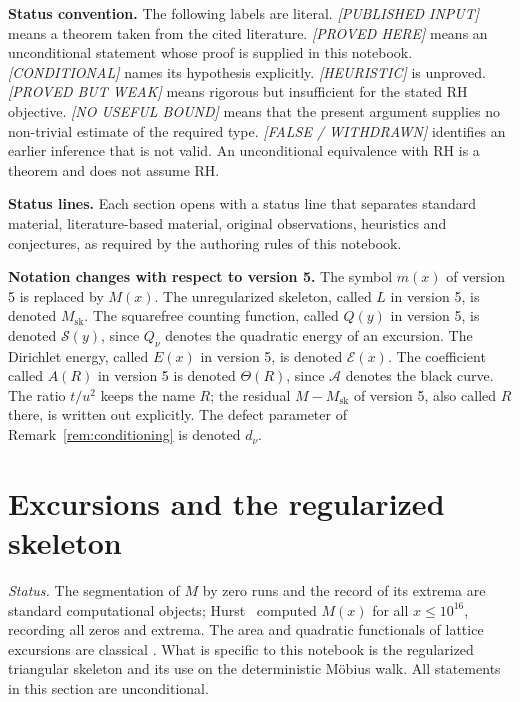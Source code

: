 \documentclass[11pt]{amsart}
\numberwithin{equation}{section}
\theoremstyle{plain}
\theoremstyle{definition}
\theoremstyle{remark}
\newcommand{\Msk}{M_{\mathrm{sk}}}
\newcommand{\Anet}{\mathcal{A}}
\newcommand{\Sq}{\mathcal{S}}
\newcommand{\En}{\mathcal{E}}
\begin{document}
\medskip
\noindent\textbf{Status convention.} The following labels are literal.
\emph{[PUBLISHED INPUT]} means a theorem taken from the cited literature.
\emph{[PROVED HERE]} means an unconditional statement whose proof is supplied
in this notebook. \emph{[CONDITIONAL]} names its hypothesis explicitly.
\emph{[HEURISTIC]} is unproved. \emph{[PROVED BUT WEAK]} means rigorous but
insufficient for the stated RH objective. \emph{[NO USEFUL BOUND]} means
that the present argument supplies no non-trivial estimate of the required
type. \emph{[FALSE / WITHDRAWN]} identifies an earlier inference that is not
valid.  An unconditional equivalence with RH is a theorem and does not assume
RH.

\medskip
\noindent\textbf{Status lines.} Each section opens with a status line that
separates standard material, literature-based material, original
observations, heuristics and conjectures, as required by the authoring rules
of this notebook.

\medskip
\noindent\textbf{Notation changes with respect to version 5.} The symbol
$m(x)$ of version 5 is replaced by $M(x)$. The unregularized skeleton, called
$L$ in version 5, is denoted $\Msk$. The squarefree counting function, called
$Q(y)$ in version 5, is denoted $\Sq(y)$, since $Q_\nu$ denotes the quadratic
energy of an excursion. The Dirichlet energy, called $E(x)$ in version 5, is
denoted $\En(x)$. The coefficient called $A(R)$ in version 5 is denoted
$\Theta(R)$, since $\Anet$ denotes the black curve. The ratio $t/u^2$ keeps
the name $R$; the residual $M-\Msk$ of version 5, also called $R$ there, is
written out explicitly. The defect parameter of
Remark~\ref{rem:conditioning} is denoted $d_\nu$.


\section{Excursions and the regularized skeleton}
\label{sec:definitions}

\noindent\emph{Status.} The segmentation of $M$ by zero runs and the record
of its extrema are standard computational objects; Hurst~\cite{Hurst18}
computed $M(x)$ for all $x\le10^{16}$, recording all zeros and extrema.  The
area and quadratic functionals of lattice excursions are classical
\cite{Takacs91,NguyenThe04,Richard05,Janson07,DKW15,CP17}.  What is specific
to this notebook is the regularized triangular skeleton and its use on the
deterministic M\"obius walk.  All statements in this section are
unconditional.
\end{document}
